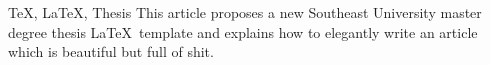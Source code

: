 \begin{abstract}{\TeX, \LaTeX, 学位论文}
本文提出了一个新的东南大学 \LaTeX 硕士研究生毕业论文模板，并说明了如何更优雅地写出一篇漂亮而无用的文章。
\end{abstract}

\begin{englishabstract}{\TeX, \LaTeX, Thesis}
This article proposes a new Southeast University master degree thesis \LaTeX ~template and explains how to elegantly write an article which is beautiful but full of shit.
\end{englishabstract}
